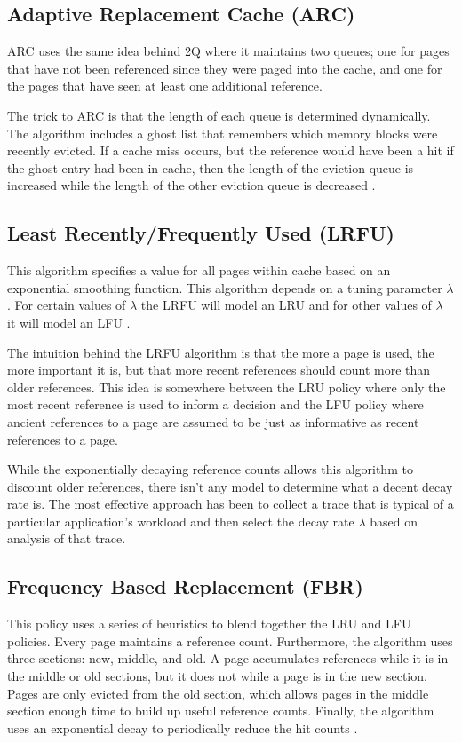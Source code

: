 \subsection{Adaptive Replacement Cache (ARC)}
  ARC uses the same idea behind 2Q where it maintains two queues; one for pages
  that have not been referenced since they were paged into the cache, and one
  for the pages that have seen at least one additional reference.

  The trick to ARC is that the length of each queue is determined
  dynamically. The algorithm includes a ghost list that remembers which
  memory blocks were recently evicted. If a cache miss occurs, but the
  reference would have been a hit if the ghost entry had been in cache, then
  the length of the eviction queue is increased while the length of the other
  eviction queue is decreased \cite{arc}.

\subsection{Least Recently/Frequently Used (LRFU)}
  This algorithm specifies a value for all pages within cache based on an
  exponential smoothing function. This algorithm depends on a tuning parameter
  $\lambda$. For certain values of $\lambda$ the LRFU will model an LRU and
  for other values of $\lambda$ it will model an LFU \cite{kim2001lrfu}.

  The intuition behind the LRFU algorithm is that the more a page is used, the
  more important it is, but that more recent references should count more than
  older references. This idea is somewhere between the LRU policy where only the
  most recent reference is used to inform a decision and the LFU policy where
  ancient references to a page are assumed to be just as informative as recent
  references to a page.

  While the exponentially decaying reference counts allows this algorithm to
  discount older references, there isn't any model to determine what a decent
  decay rate is. The most effective approach has been to collect a trace that is
  typical of a particular application's workload and then select the decay rate
  $\lambda$ based on analysis of that trace.

\subsection{Frequency Based Replacement (FBR)}
  This policy uses a series of heuristics to blend together the LRU and LFU
  policies. Every page maintains a reference count. Furthermore, the algorithm
  uses three sections: new, middle, and old. A page accumulates references while
  it is in the middle or old sections, but it does not while a page is in the
  new section. Pages are only evicted from the old section, which allows pages
  in the middle section enough time to build up useful reference counts.
  Finally, the algorithm uses an exponential decay to periodically reduce the
  hit counts \cite{robinson1990data}.

